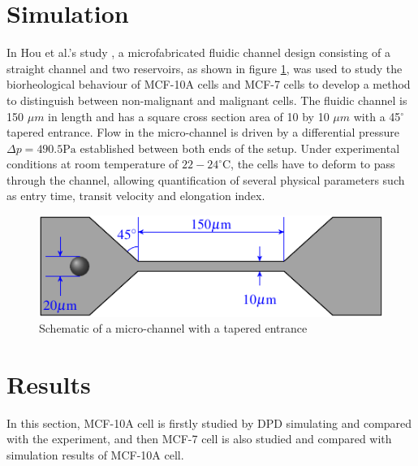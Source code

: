\documentclass[review]{elsarticle}
\begin{document}
\section{Simulation}\label{simulation}
In Hou et al.'s study \cite{hou_deformability_2009}, a microfabricated fluidic channel design consisting of a straight channel and two reservoirs, as shown in figure \ref{fig:experimental_setup}, was used to study the biorheological behaviour of MCF-10A cells and MCF-7 cells to develop a method to distinguish between non-malignant and malignant cells. 
The fluidic channel is 150 $\mu m$ in length and has a square cross section area of 10 by 10 $\mu m$ with a 45$^\circ$ tapered entrance. Flow in the micro-channel is driven by a differential pressure $\Delta p = 490.5 \mathrm{Pa}$ established between both ends of the setup. Under experimental conditions at room temperature of $22-24 ^\circ\mathrm{C}$, the cells have to deform to pass through the channel, allowing quantification of several physical parameters such as entry time, transit velocity and elongation index. 
\begin{figure}[!htb]
\centering
\includegraphics{3Dchannel.pdf}
\caption{\label{fig:experimental_setup}Schematic of a micro-channel with a tapered entrance}
\end{figure}


\section{Results}\label{results}
In this section, MCF-10A cell is firstly studied by DPD simulating and compared with the experiment, and then MCF-7 cell is also studied and compared with simulation results of MCF-10A cell. 
\end{document}
